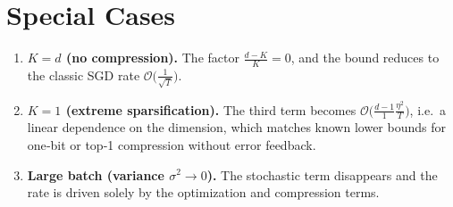 \documentclass[11pt]{article}
\begin{document}
\section*{Special Cases}
\begin{enumerate}[label=\alph*)]
\item \textbf{$K=d$ (no compression).} The factor $\frac{d-K}{K}=0$, and the bound reduces to the classic SGD rate $\mathcal{O}\big(\frac{1}{\sqrt{T}}\big)$.
\item \textbf{$K=1$ (extreme sparsification).} The third term becomes $\mathcal{O}\big(\frac{d-1}{1}\frac{\eta^{2}}{T}\big)$, i.e.\ a linear dependence on the dimension, which matches known lower bounds for one‑bit or top‑1 compression without error feedback.
\item \textbf{Large batch (variance $\sigma^{2}\!\to\!0$).} The stochastic term disappears and the rate is driven solely by the optimization and compression terms.
\end{enumerate}
\end{document}
